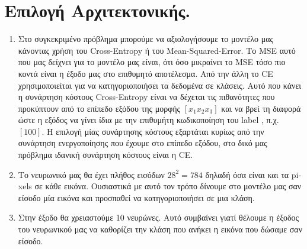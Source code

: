 \documentclass[12pt,a4paper]{article}
\newcommand{\tl}{\textlatin}
\begin{document}
    \section{Επιλογή Αρχιτεκτονικής.}

    \begin{enumerate}[a]
        \item Στο συγκεκριμένο πρόβλημα μπορούμε να αξιολογήσουμε το μοντέλο μας κάνοντας χρήση του \tl{Cross-Entropy} ή του \tl{Mean-Squared-Error}. Το \tl{MSE} αυτό που μας δείχνει για το μοντέλο μας είναι, ότι όσο μικραίνει το \tl{MSE} τόσο πιο κοντά είναι η έξοδο μας στο επιθυμητό αποτέλεσμα. Από την άλλη το \tl{CE} χρησιμοποιείται για να κατηγοριοποιήσει τα δεδομένα σε κλάσεις. Αυτό που κάνει η συνάρτηση κόστους \tl{Cross-Entropy} είναι να δέχεται τις πιθανότητες που προκύπτουν από το επίπεδο εξόδου της μορφής $[x_1 x_2 x_3]$ και να βρεί τη διαφορά ώστε η εξόδος να γίνει ίδια με την επιθυμήτη κωδικοποίηση του \tl{label} , π.χ. $[1 0 0 ]$.
        Η επιλογή μίας συνάρτησης κόστους εξαρτάται κυρίως από την συνάρτηση ενεργοποίησης που έχουμε στο επίπεδο εξόδου, στο δικό μας πρόβλημα ιδανική συνάρτηση κόστους είναι η \tl{CE}.

        \item Το νευρωνικό μας θα έχει πλήθος εισόδων $ 28^2 = 784 $ δηλαδή όσα είναι και  τα \tl{pixels} σε κάθε εικόνα. Ουσιαστικά με αυτό τον τρόπο δίνουμε στο μοντέλο μας σαν είσοδο μία εικόνα και προσπαθεί να κατηγοριοποιήσει σε μια κλάση. 

        \item Στην έξοδο θα χρειαστούμε 10 νευρώνες.  Αυτό συμβαίνει γιατί θέλουμε η έξοδος του νευρωνικού μας να καθορίζει την κλάση που ανήκει η εικόνα που δώσαμε σαν είσοδο.


\end{enumerate}
\end{document}
